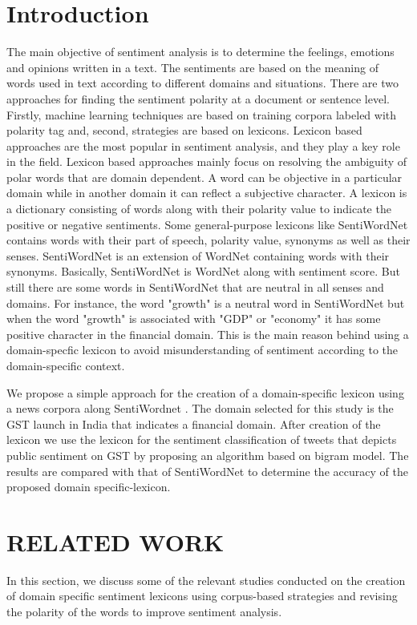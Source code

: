 \documentclass[conference]{IEEEtran}
\begin{document}
\section{Introduction}
The main objective of sentiment analysis is to determine  the feelings, emotions and opinions written in a
text. The sentiments are based on the meaning of words used in text according to different domains and situations. There are two approaches for finding the sentiment polarity at a document	or sentence level. Firstly, machine learning techniques are based on training corpora labeled with polarity tag and, second, strategies are based on lexicons. Lexicon based approaches are the most popular in sentiment analysis, and they play a key role in the field. Lexicon based approaches mainly focus on resolving the ambiguity of polar words that are domain dependent. A word can be objective in a particular domain while in another domain it can reflect a subjective character. A lexicon is a dictionary consisting of	words along with their polarity value to indicate the positive or negative sentiments. Some general-purpose lexicons like SentiWordNet \cite{c1} contains words with their part of speech, polarity value, synonyms as well as their senses. SentiWordNet is an extension of WordNet containing words with their synonyms. Basically, SentiWordNet is WordNet along with sentiment score. But still there are some words in SentiWordNet that are neutral in all senses and domains. For instance, the word "growth" is a neutral word in SentiWordNet but when the word "growth" is associated with "GDP" or "economy" it has some positive character in the financial domain. This is the main reason behind using a domain-specfic lexicon to avoid misunderstanding of sentiment according to the domain-specific context.

We propose a simple approach for the creation of a domain-specific lexicon using a news corpora along SentiWordnet \cite{c1}. The domain selected for this study is the GST launch in India that indicates a financial domain. After creation of the lexicon we use the lexicon for the sentiment classification of tweets that depicts public sentiment on GST by proposing an algorithm based on bigram model. The results are compared with that of SentiWordNet to determine the accuracy of the proposed domain specific-lexicon.


\section{RELATED WORK}
In this section, we discuss some of the relevant studies conducted on the creation of domain specific sentiment lexicons using corpus-based strategies and revising the polarity of the words to improve sentiment analysis.
\end{document}
